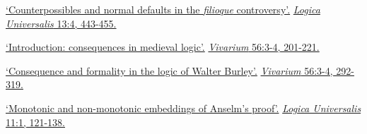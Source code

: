 	\item {}
{%
	\href{https://www.academia.edu/41385588/Counterpossibles_and_Normal_Defaults_in_the_Filioque_Controversy}{`Counterpossibles and normal defaults in the \emph{filioque} controversy'.} \href{https://link.springer.com/article/10.1007\%2Fs11787-019-00229-x}{\emph{Logica Universalis} 13:4, 443-455.}
}
{}
	\item {}
{}
{
	\href{https://www.academia.edu/38134285/Introduction_Consequences_in_Medieval_Logic}{`Introduction: consequences in medieval logic'.} \href{https://brill.com/view/journals/viv/56/3-4/article-p201_1.xml?language=en}{\emph{Vivarium} 56:3-4, 201-221.}}
{}
	\item \datedsubsectionnarrow{}
{}
{
	\href{https://www.academia.edu/38134091/Consequence_and_formality_in_the_logic_of_Walter_Burley}{`Consequence and formality in the logic of Walter Burley'.} \href{https://brill.com/view/journals/viv/56/3-4/article-p292_5.xml?language=en}{\emph{Vivarium} 56:3-4, 292-319.}}
{}
	\item {}
{}
{
	\href{https://www.academia.edu/29444391/Monotonic_and_non_monotonic_embeddings_of_Anselms_proof}{`Monotonic and non-monotonic embeddings of Anselm's proof'.} \href{https://link.springer.com/article/10.1007/s11787-017-0162-7}{\emph{Logica Universalis} 11:1, 121-138.}}
{}
